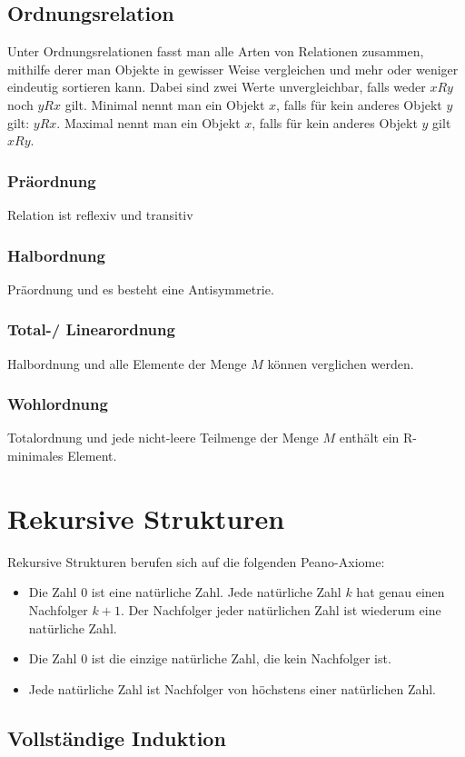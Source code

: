 \documentclass{article}
\begin{document}
\subsection{Ordnungsrelation}
Unter Ordnungsrelationen fasst man alle Arten von Relationen zusammen, mithilfe derer man Objekte in gewisser Weise vergleichen und mehr oder weniger eindeutig sortieren kann. Dabei sind zwei Werte unvergleichbar, falls weder $xRy$ noch $yRx$ gilt. Minimal nennt man ein Objekt $x$, falls für kein anderes Objekt $y$ gilt: $yRx$.
Maximal nennt man ein Objekt $x$, falls für kein anderes Objekt $y$ gilt $xRy$.
\subsubsection{Präordnung}
Relation ist reflexiv und transitiv
\subsubsection{Halbordnung}
Präordnung und es besteht eine Antisymmetrie.
\subsubsection{Total-/ Linearordnung}
Halbordnung und alle Elemente der Menge $M$ können verglichen werden.
\subsubsection{Wohlordnung}
Totalordnung und jede nicht-leere Teilmenge der Menge $M$ enthält ein R-minimales Element.
\newpage
\section{Rekursive Strukturen}
Rekursive Strukturen berufen sich auf die folgenden Peano-Axiome:
\begin{itemize}
		\item Die Zahl 0 ist eine natürliche Zahl. Jede natürliche Zahl $k$ hat genau einen Nachfolger $k+1$. Der Nachfolger jeder natürlichen Zahl ist wiederum eine natürliche Zahl.
		\item Die Zahl 0 ist die einzige natürliche Zahl, die kein Nachfolger ist.
		\item Jede natürliche Zahl ist Nachfolger von höchstens einer natürlichen Zahl.
\end{itemize}

\subsection{Vollständige Induktion}
\end{document}
